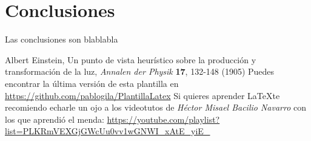 \documentclass[12pt,a4paper]{article}
\begin{document}
\section{Conclusiones}
Las conclusiones son blablabla



\newpage

\begin{thebibliography}{99} %
 Albert Einstein, Un punto de vista heurístico sobre la producción y transformación de la luz, \textit{Annalen der Physik} \textbf{17}, 132-148 (1905)
 Puedes encontrar la última versión de esta plantilla en \url{https://github.com/pablogila/PlantillaLatex}
 Si quieres aprender \LaTeX te recomiendo echarle un ojo a los videotutos de \textit{Héctor Misael Bacilio Navarro} con los que aprendió el menda: \url{https://youtube.com/playlist?list=PLKRmVEXGjGWcUu0vv1wGNWI_xAtE_yiE_}
\end{thebibliography}
\end{document}

